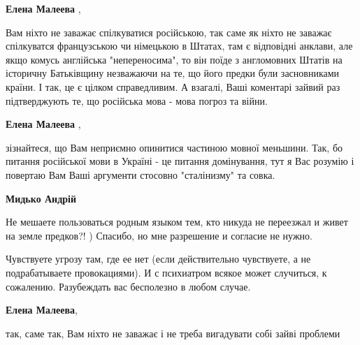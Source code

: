 \begin{itemize}
\begin{itemize}
\textbf{Елена Малеева} , 

Вам ніхто не заважає спілкуватися російською, так саме як ніхто не заважає
спілкуватся французською чи німецькою в Штатах, там є відповідні анклави, але
якщо комусь англійська "непереносима", то він поїде з англомовних Штатів на
історичну Батьківщину незважаючи на те, що його предки були засновниками
країни. І так, це є цілком справедливим. А взагалі, Ваші коментарі зайвий раз
підтверджують те, що російська мова - мова погроз та війни.


 
\textbf{Елена Малеева} , 

зізнайтеся, що Вам неприємно опинитися частиною мовної меньшини. Так, бо
питання російської мови в Україні - це питання домінування, тут я Вас розумію і
повертаю Вам Ваші аргументи стосовно "сталінизму" та совка.

 
\textbf{Мидько Андрій} 

Не мешаете пользоваться родным языком тем, кто никуда не переезжал и живет на
земле предков?! ) Спасибо, но мне разрешение и согласие не нужно.

Чувствуете угрозу там, где ее нет (если действительно чувствуете, а не
подрабатываете провокациями). И с психиатром всякое может случиться, к
сожалению. Разубеждать вас бесполезно в любом случае.


 
\textbf{Елена Малеева}, 

так, саме так, Вам ніхто не заважає і не треба вигадувати собі зайві проблеми

\end{itemize}

 


\end{itemize}
